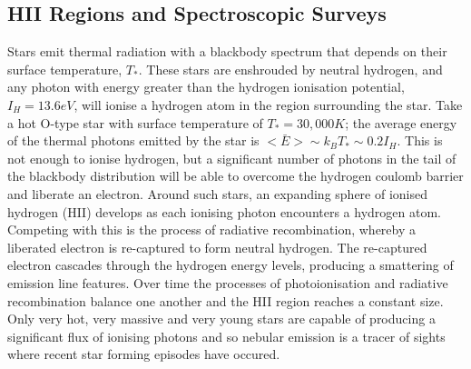 \documentclass{literature}
\begin{document}
\subsection{HII Regions and Spectroscopic Surveys}\label{subsec:HII_regions}
Stars emit thermal radiation with a blackbody spectrum that depends on their surface temperature, $T_{*}$. These stars are enshrouded by neutral hydrogen, and any photon with energy greater than the hydrogen ionisation potential, $I_{H} = 13.6eV$, will ionise a hydrogen atom in the region surrounding the star. Take a hot O-type star with surface temperature of $T_{*} = 30,000 K$; the average energy of the thermal photons emitted by the star is $<\bar{E}> \sim k_{B}T_{*} \sim 0.2I_{H}$. This is not enough to ionise hydrogen, but a significant number of photons in the tail of the blackbody distribution will be able to overcome the hydrogen coulomb barrier and liberate an electron. Around such stars, an expanding sphere of ionised hydrogen (HII) develops as each ionising photon encounters a hydrogen atom. Competing with this is the process of radiative recombination, whereby a liberated electron is re-captured to form neutral hydrogen. The re-captured electron cascades through the hydrogen energy levels, producing a smattering of emission line features. Over time the processes of photoionisation and radiative recombination balance one another and the HII region reaches a constant size. Only very hot, very massive and very young stars are capable of producing a significant flux of ionising photons and so nebular emission is a tracer of sights where recent star forming episodes have occured. \\ 
\end{document}
